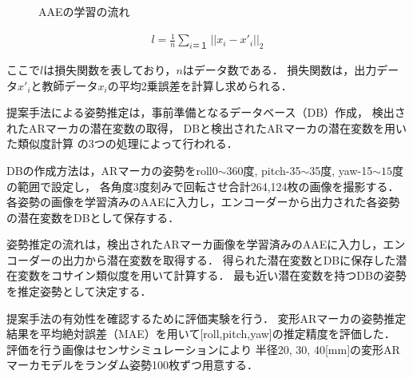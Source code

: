 \documentclass{jsarticle}
\begin{document}
\begin{figure}[ht]
\vspace{0zh}
\setlength{\epsfxsize}{7.5cm}
\centerline{}
\vspace{0zh}
\caption{AAEの学習の流れ}
\label{BB}
\vspace{-3zh}
\end{figure}




\begin{eqnarray}
\label{sonsitu}
l=\frac{1}{n}\sum_{i＝１} ||x_i-x'_i||_2
\end{eqnarray}

ここで$l$は損失関数を表しており，$n$はデータ数である．
損失関数は，出力データ$x'_i$と教師データ$x_i$の平均2乗誤差を計算し求められる．




提案手法による姿勢推定は，事前準備となるデータベース（DB）作成，
検出されたARマーカの潜在変数の取得，
DBと検出されたARマーカの潜在変数を用いた類似度計算
の3つの処理によって行われる．

DBの作成方法は，ARマーカの姿勢をroll0$\sim$360度, pitch-35$\sim$35度, yaw-15$\sim15$度の範囲で設定し，
各角度3度刻みで回転させ合計264,124枚の画像を撮影する．
各姿勢の画像を学習済みのAAEに入力し，エンコーダーから出力された各姿勢の潜在変数をDBとして保存する．

姿勢推定の流れは，検出されたARマーカ画像を学習済みのAAEに入力し，エンコーダーの出力から潜在変数を取得する．
得られた潜在変数とDBに保存した潜在変数をコサイン類似度を用いて計算する．
最も近い潜在変数を持つDBの姿勢を推定姿勢として決定する．








提案手法の有効性を確認するために評価実験を行う．
変形ARマーカの姿勢推定結果を平均絶対誤差（MAE）を用いて[roll,pitch,yaw]の推定精度を評価した．
評価を行う画像はセンサシミュレーションにより	
半径20, 30, 40[mm]の変形ARマーカモデルをランダム姿勢100枚ずつ用意する．
\end{document}
